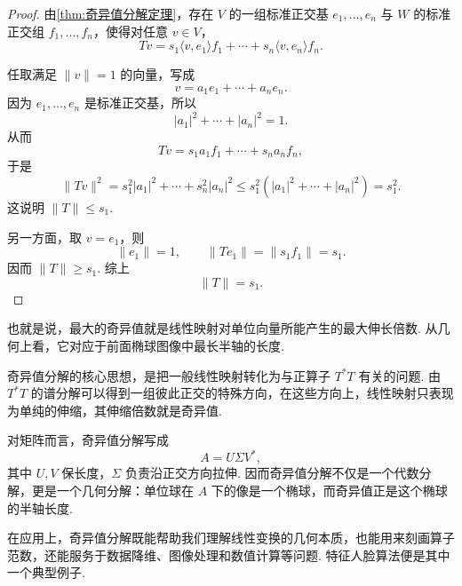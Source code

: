 \begin{proof}
    由\autoref{thm:奇异值分解定理}，存在 $V$ 的一组标准正交基 $e_1, \ldots, e_n$ 与 $W$ 的标准正交组 $f_1, \ldots, f_n$，使得对任意 $v \in V$，
    \[
        Tv = s_1 \langle v, e_1 \rangle f_1 + \cdots + s_n \langle v, e_n \rangle f_n.
    \]

    任取满足 $\lVert v \rVert = 1$ 的向量，写成
    \[
        v = a_1e_1 + \cdots + a_ne_n.
    \]
    因为 $e_1, \ldots, e_n$ 是标准正交基，所以
    \[
        |a_1|^2 + \cdots + |a_n|^2 = 1.
    \]
    从而
    \[
        Tv = s_1a_1f_1 + \cdots + s_na_nf_n,
    \]
    于是
    \[
        \lVert Tv \rVert^2 = s_1^2|a_1|^2 + \cdots + s_n^2|a_n|^2 \leqslant s_1^2(|a_1|^2 + \cdots + |a_n|^2) = s_1^2.
    \]
    这说明 $\lVert T \rVert \leqslant s_1$.

    另一方面，取 $v = e_1$，则
    \[
        \lVert e_1 \rVert = 1,\qquad \lVert Te_1 \rVert = \lVert s_1f_1 \rVert = s_1.
    \]
    因而 $\lVert T \rVert \geqslant s_1$. 综上
    \[
        \lVert T \rVert = s_1.
    \]
\end{proof}

也就是说，最大的奇异值就是线性映射对单位向量所能产生的最大伸长倍数. 从几何上看，它对应于前面椭球图像中最长半轴的长度.

\begin{summary}
    奇异值分解的核心思想，是把一般线性映射转化为与正算子 $T^*T$ 有关的问题. 由 $T^*T$ 的谱分解可以得到一组彼此正交的特殊方向，在这些方向上，线性映射只表现为单纯的伸缩，其伸缩倍数就是奇异值.

    对矩阵而言，奇异值分解写成
    \[
        A = U\Sigma V^*,
    \]
    其中 $U, V$ 保长度，$\Sigma$ 负责沿正交方向拉伸. 因而奇异值分解不仅是一个代数分解，更是一个几何分解：单位球在 $A$ 下的像是一个椭球，而奇异值正是这个椭球的半轴长度.

    在应用上，奇异值分解既能帮助我们理解线性变换的几何本质，也能用来刻画算子范数，还能服务于数据降维、图像处理和数值计算等问题. 特征人脸算法便是其中一个典型例子.
\end{summary}

